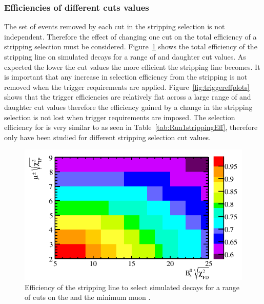 
\subsubsection*{Efficiencies of different cuts values}
The set of events removed by each cut in the stripping selection is not independent. Therefore the effect of changing one cut on the total efficiency of a stripping selection must be considered. Figure~\ref{fig:efficiencyplots} shows the total efficiency of the \bsmumu stripping line on simulated \bsmumu decays for a range of \chiFD and daughter \chiIP cut values. As expected the lower the cut values the more efficient the stripping line becomes. It is important that any increase in \bsmumu selection efficiency from the stripping is not removed when the trigger requirements are applied. Figure~\ref{fig:triggereffplots} shows that the trigger efficiencies are relatively flat across a large range of \chiFD and daughter \chiIP cut values therefore the efficiency gained by a change in the stripping selection is not lost when trigger requirements are imposed. The selection efficiency for \bdmumu is very similar to \bsmumu as seen in Table~\ref{tab:Run1strippingEff}, therefore only \bsmumu have been studied for different stripping selection cut values. 


\begin{figure}[tbp]
    \centering
        \includegraphics[width= 0.8 \textwidth]{./Figs/Selection/Bs2MuMu_efficiency_chart_Feb3.png}
    \caption{Efficiency of the \bmumu stripping line to select \bsmumu simulated decays for a range of cuts on the \bs \chiFD and the minimum muon \chiIP.}
    \label{fig:efficiencyplots}
\end{figure}

